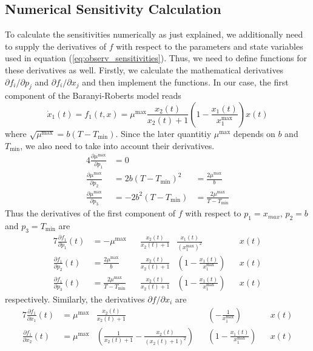 \documentclass[10pt,A4paper]{article}
\begin{document}
\subsection*{Numerical Sensitivity Calculation}
To calculate the sensitivities numerically as just explained, we additionally need to supply the derivatives of $f$ with respect to the parameters and state variables used in equation (\ref{eq:observ_sensitivities}).
Thus, we need to define functions for these derivatives as well.
Firstly, we calculate the mathematical derivatives $\partial f_i/\partial p_j$ and $\partial f_i/\partial x_j$ and then implement the functions.
In our case, the first component of the Baranyi-Roberts model reads
\begin{equation}
    \dot x_1(t) = f_1(t, x) = \mu^\text{max} \frac{x_2(t)}{x_2(t) + 1} \left(1 - \frac{x_1(t)}{x_1^\text{max}}\right) x(t)
\end{equation}
where $\sqrt{\mu^\text{max}}=b(T-T_\text{min})$.
Since the later quantitiy $\mu^\text{max}$ depends on $b$ and $T_\text{min}$, we also need to take into account their derivatives.
\begin{alignat}{4}
    \frac{\partial\mu^\text{max}}{\partial p_1} &= 0\\
    \frac{\partial\mu^\text{max}}{\partial p_2} &= 2b(T-T_\text{min})^2 &= \frac{2\mu^\text{max}}{b}\\
    \frac{\partial\mu^\text{max}}{\partial p_3} &= -2b^2(T-T_\text{min}) &= \frac{2\mu^\text{max}}{T-T_\text{min}}
\end{alignat}
Thus the derivatives of the first component of $f$ with respect to $p_1=x_{max}$, $p_2=b$ and $p_3=T_\text{min}$ are
\begin{alignat}{7}
    \frac{\partial f_1}{\partial p_1}(t) &= - \mu^\text{max} &&\frac{x_2(t)}{x_2(t) + 1} &\frac{x_1(t)}{\left(x_1^\text{max}\right)^2} &&x(t)\\
    \frac{\partial f_1}{\partial p_2}(t) &= \frac{2\mu^\text{max}}{b} &&\frac{x_2(t)}{x_2(t) + 1} &\left(1 - \frac{x_1(t)}{x_1^\text{max}}\right) &&x(t)\\
    \frac{\partial f_1}{\partial p_3}(t) &= \frac{2\mu^\text{max}}{T-T_\text{min}} &&\frac{x_2(t)}{x_2(t) + 1} &\left(1 - \frac{x_1(t)}{x_1^\text{max}}\right) &&x(t)
\end{alignat}
respectively.
Similarly, the derivatives $\partial f/\partial x_i$ are
\begin{alignat}{7}
    \frac{\partial f_1}{\partial x_1}(t) &= \mu^\text{max} &\frac{x_2(t)}{x_2(t) + 1} && \left(-\frac{1}{x_1^\text{max}}\right) &&x(t)\\
    \frac{\partial f_1}{\partial x_2}(t) &= \mu^\text{max} &\left(\frac{1}{x_2(t) + 1} - \frac{x_2(t)}{(x_2(t) + 1)^2}\right) && \left(1 - \frac{x_1(t)}{x_1^\text{max}}\right) &&x(t)
\end{alignat}
\end{document}
